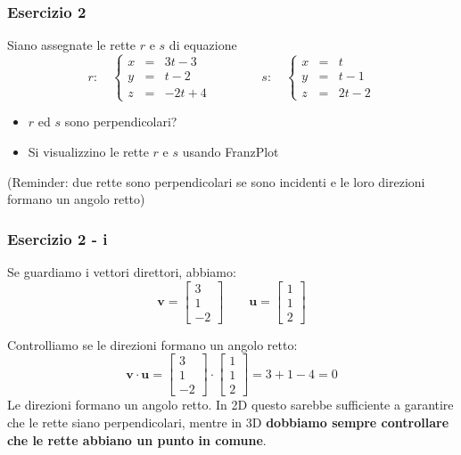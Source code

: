 \documentclass{beamer}
\newcommand{\frnzplt}{FranzPlot }
\begin{document}
\begin{frame}
\frametitle{Esercizio 2}

Siano assegnate le rette $r$ e $s$ di equazione
$$
r: \quad \left\{
\begin{array}{lcr}
x&=&3t-3\\
y&=&t-2\\
    z&=&-2t+4
\end{array}
\right. \qquad \qquad s: \quad \left\{
\begin{array}{lcr}
x&=&t\\
y&=&t-1\\
z&=&2t-2
\end{array}
\right.
$$

    \begin{itemize}
    \item $r$ ed $s$ sono perpendicolari? 
    \item Si visualizzino le rette $r$ e $s$ usando \frnzplt
    \end{itemize}
    
    \vspace{0.75cm}
    (Reminder: due rette sono perpendicolari se sono incidenti e le loro direzioni formano un angolo retto)
\end{frame}

\begin{frame}
\frametitle{Esercizio 2 - i}

Se guardiamo i vettori direttori, abbiamo:
$$
\mathbf{v} = \left[
\begin{array}{c}
3\\
1\\
-2
\end{array}
\right]
\qquad
    \mathbf{u} = \left[
\begin{array}{c}
1\\
1\\
2
\end{array}
\right]
$$

Controlliamo se le direzioni formano un angolo retto:
$$
\mathbf{v}  \cdot  \mathbf{u}
    = \left[
\begin{array}{c}
3\\
1\\
-2
\end{array}
\right]
\cdot
 \left[
\begin{array}{c}
1\\
1\\
2
\end{array}
\right]
= 3 + 1 - 4 = 0
$$
Le direzioni formano un angolo retto.
In 2D questo sarebbe sufficiente a garantire che le rette siano perpendicolari,
mentre in 3D \textbf{dobbiamo sempre controllare che le rette abbiano un punto in comune}.

\end{frame}
\end{document}
